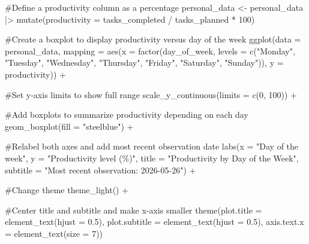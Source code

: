 \documentclass[
  letterpaper,
  DIV=11,
  numbers=noendperiod]{scrartcl}
\newenvironment{Shaded}{\begin{snugshade}}{\end{snugshade}}
\newcommand{\AttributeTok}[1]{\textcolor[rgb]{0.40,0.45,0.13}{#1}}
\newcommand{\CommentTok}[1]{\textcolor[rgb]{0.37,0.37,0.37}{#1}}
\newcommand{\DecValTok}[1]{\textcolor[rgb]{0.68,0.00,0.00}{#1}}
\newcommand{\FloatTok}[1]{\textcolor[rgb]{0.68,0.00,0.00}{#1}}
\newcommand{\FunctionTok}[1]{\textcolor[rgb]{0.28,0.35,0.67}{#1}}
\newcommand{\NormalTok}[1]{\textcolor[rgb]{0.00,0.23,0.31}{#1}}
\newcommand{\OtherTok}[1]{\textcolor[rgb]{0.00,0.23,0.31}{#1}}
\newcommand{\SpecialCharTok}[1]{\textcolor[rgb]{0.37,0.37,0.37}{#1}}
\newcommand{\StringTok}[1]{\textcolor[rgb]{0.13,0.47,0.30}{#1}}
\begin{document}
\begin{Shaded}
\begin{Highlighting}[]
\CommentTok{\#Define a productivity column as a percentage}
\NormalTok{personal\_data }\OtherTok{\textless{}{-}}\NormalTok{ personal\_data }\SpecialCharTok{|\textgreater{}}
  \FunctionTok{mutate}\NormalTok{(}\AttributeTok{productivity =}\NormalTok{ tasks\_completed }\SpecialCharTok{/}\NormalTok{ tasks\_planned }\SpecialCharTok{*} \DecValTok{100}\NormalTok{)}

\CommentTok{\#Create a boxplot to display productivity versus day of the week}
\FunctionTok{ggplot}\NormalTok{(}\AttributeTok{data =}\NormalTok{ personal\_data,}
       \AttributeTok{mapping =} \FunctionTok{aes}\NormalTok{(}\AttributeTok{x =} \FunctionTok{factor}\NormalTok{(day\_of\_week,}
                                \AttributeTok{levels =} \FunctionTok{c}\NormalTok{(}\StringTok{"Monday"}\NormalTok{,}
                                           \StringTok{"Tuesday"}\NormalTok{,}
                                           \StringTok{"Wednesday"}\NormalTok{,}
                                           \StringTok{"Thursday"}\NormalTok{,}
                                           \StringTok{"Friday"}\NormalTok{,}
                                           \StringTok{"Saturday"}\NormalTok{,}
                                           \StringTok{"Sunday"}\NormalTok{)),}
                     \AttributeTok{y =}\NormalTok{ productivity)) }\SpecialCharTok{+}

\CommentTok{\#Set y{-}axis limits to show full range}
\FunctionTok{scale\_y\_continuous}\NormalTok{(}\AttributeTok{limits =} \FunctionTok{c}\NormalTok{(}\DecValTok{0}\NormalTok{, }\DecValTok{100}\NormalTok{)) }\SpecialCharTok{+}

\CommentTok{\#Add boxplots to summarize productivity depending on each day}
\FunctionTok{geom\_boxplot}\NormalTok{(}\AttributeTok{fill =} \StringTok{"steelblue"}\NormalTok{) }\SpecialCharTok{+}

\CommentTok{\#Relabel both axes and add most recent observation date}
\FunctionTok{labs}\NormalTok{(}\AttributeTok{x =} \StringTok{"Day of the week"}\NormalTok{,}
     \AttributeTok{y =} \StringTok{"Productivity level (\%)"}\NormalTok{,}
     \AttributeTok{title =} \StringTok{"Productivity by Day of the Week"}\NormalTok{,}
     \AttributeTok{subtitle =} \StringTok{"Most recent observation: 2026{-}05{-}26"}\NormalTok{) }\SpecialCharTok{+}

\CommentTok{\#Change theme}
\FunctionTok{theme\_light}\NormalTok{() }\SpecialCharTok{+}
  
\CommentTok{\#Center title and subtitle and make x{-}axis smaller}
\FunctionTok{theme}\NormalTok{(}\AttributeTok{plot.title =} \FunctionTok{element\_text}\NormalTok{(}\AttributeTok{hjust =} \FloatTok{0.5}\NormalTok{),}
      \AttributeTok{plot.subtitle =} \FunctionTok{element\_text}\NormalTok{(}\AttributeTok{hjust =} \FloatTok{0.5}\NormalTok{),}
      \AttributeTok{axis.text.x =} \FunctionTok{element\_text}\NormalTok{(}\AttributeTok{size =} \DecValTok{7}\NormalTok{))}
\end{Highlighting}
\end{Shaded}
\end{document}
